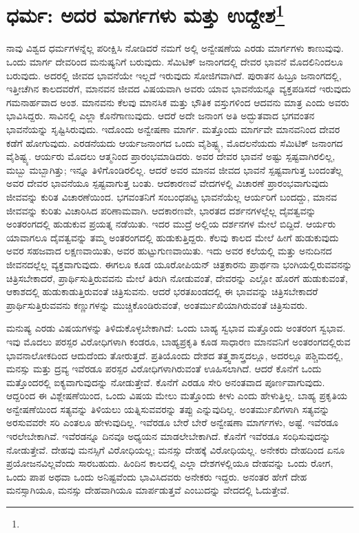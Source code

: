
\chapter[ಧರ್ಮ: ಅದರ ಮಾರ್ಗಗಳು ಮತ್ತು ಉದ್ದೇಶ]{ಧರ್ಮ: ಅದರ ಮಾರ್ಗಗಳು ಮತ್ತು ಉದ್ದೇಶ\protect\footnote{}}

ನಾವು ವಿಶ್ವದ ಧರ್ಮಗಳನ್ನೆಲ್ಲ ಪರೀಕ್ಷಿಸಿ ನೋಡಿದರೆ ನಮಗೆ ಅಲ್ಲಿ ಅನ್ವೇಷಣೆಯ ಎರಡು ಮಾರ್ಗಗಳು ಕಾಣುವುವು. ಒಂದು ಮಾರ್ಗ ದೇವರಿಂದ ಮನುಷ್ಯನಿಗೆ ಬರುವುದು. ಸೆಮಿಟಿಕ್ ಜನಾಂಗದಲ್ಲಿ ದೇವರ ಭಾವನೆ ಮೊದಲಿನಿಂದಲೂ ಬರುವುದು. ಅದರಲ್ಲಿ ಜೀವದ ಭಾವನೆಯೇ ಇಲ್ಲದೆ ಇರುವುದು ಸೋಜಿಗವಾಗಿದೆ. ಪುರಾತನ ಹಿಬ್ರೂ ಜನಾಂಗದಲ್ಲಿ, ಇತ್ತೀಚೆಗಿನ ಕಾಲದವರೆಗೆ, ಮಾನವನ ಜೀವದ ವಿಷಯವಾಗಿ ಅವರು ಯಾವ ಭಾವನೆಯನ್ನೂ ವ್ಯಕ್ತಪಡಿಸದೆ ಇರುವುದು ಗಮನಾರ್ಹವಾದ ಅಂಶ. ಮಾನವನು ಕೆಲವು ಮಾನಸಿಕ ಮತ್ತು ಭೌತಿಕ ವಸ್ತುಗಳಿಂದ ಆದವನು ಮಾತ್ರ ಎಂದು ಅವರು ಭಾವಿಸಿದ್ದರು. ಸಾವಿನಲ್ಲಿ ಎಲ್ಲಾ ಕೊನೆಗಾಣುವುದು. ಆದರೆ ಅದೇ ಜನಾಂಗ ಅತಿ ಅದ್ಭುತವಾದ ಭಗವಂತನ ಭಾವನೆಯನ್ನು ಸೃಷ್ಟಿಸಿರುವುದು. ಇದೊಂದು ಅನ್ವೇಷಣಾ ಮಾರ್ಗ. ಮತ್ತೊಂದು ಮಾರ್ಗವೇ ಮಾನವನಿಂದ ದೇವರ ಕಡೆಗೆ ಹೋಗುವುದು. ಎರಡನೆಯದು ಆರ್ಯಜನಾಂಗದ ಒಂದು ವೈಶಿಷ್ಟ್ಯ, ಮೊದಲನೆಯದು ಸೆಮಿಟಿಕ್ ಜನಾಂಗದ ವೈಶಿಷ್ಟ್ಯ. ಆರ್ಯರು ಮೊದಲು ಆತ್ಮನಿಂದ ಪ್ರಾರಂಭಮಾಡಿದರು. ಅವರ ದೇವರ ಭಾವನೆ ಅಷ್ಟು ಸ್ಪಷ್ಟವಾಗಿರಲಿಲ್ಲ, ಮಬ್ಬು ಮಬ್ಬಾಗಿತ್ತು; ಇನ್ನೂ ತಿಳಿಗೊಂಡಿರಲಿಲ್ಲ. ಆದರೆ ಅವರ ಮಾನವ ಜೀವದ ಭಾವನೆ ಸ್ಪಷ್ಟವಾಗುತ್ತ ಬಂದಂತೆಲ್ಲ ಅವರ ದೇವರ ಭಾವನೆಯೂ ಸ್ಪಷ್ಟವಾಗುತ್ತ ಬಂತು. ಆದಕಾರಣವೆ ವೇದಗಳಲ್ಲಿ ವಿಚಾರಣೆ ಪ್ರಾರಂಭವಾಗುವುದು ಜೀವವನ್ನು ಕುರಿತ ವಿಚಾರಣೆಯಿಂದ. ಭಗವಂತನಿಗೆ ಸಂಬಂಧಪಟ್ಟ ಭಾವನೆಯೆಲ್ಲ ಆರ್ಯರಿಗೆ ಬಂದದ್ದು, ಮಾನವ ಜೀವವನ್ನು ಕುರಿತು ವಿಚಾರಿಸಿದ ಪರಿಣಾಮವಾಗಿ. ಆದಕಾರಣವೇ, ಭಾರತದ ದರ್ಶನಗಳಲ್ಲೆಲ್ಲ ದೈವತ್ವವನ್ನು ಅಂತರಂಗದಲ್ಲಿ ಹುಡುಕುವ ಪ್ರಯತ್ನ ನಡೆಯಿತು. ಇದರ ಮುದ್ರೆ ಅಲ್ಲಿಯ ದರ್ಶನಗಳ ಮೇಲೆ ಬಿದ್ದಿದೆ. ಆರ್ಯರು ಯಾವಾಗಲೂ ದೈವತ್ವವನ್ನು ತಮ್ಮ ಅಂತರಂಗದಲ್ಲಿ ಹುಡುಕುತ್ತಿದ್ದರು. ಕೆಲವು ಕಾಲದ ಮೇಲೆ ಹೀಗೆ ಹುಡುಕುವುದು ಅವರ ಸಹಜವಾದ ಲಕ್ಷಣವಾಯಿತು, ಅವರ ಹುಟ್ಟುಗುಣವಾಯಿತು. ಇದು ಅವರ ಕಲೆಯಲ್ಲಿ ಮತ್ತು ಅನುದಿನದ ಜೀವನದಲ್ಲೆಲ್ಲ ವ್ಯಕ್ತವಾಗುವುದು. ಈಗಲೂ ಕೂಡ ಯೂರೋಪಿಯನ್ ಚಿತ್ರಕಾರನು ಪ್ರಾರ್ಥನಾ ಭಂಗಿಯಲ್ಲಿರುವವನನ್ನು ಚಿತ್ರಿಸಬೇಕಾದರೆ, ಪ್ರಾರ್ಥಿಸುತ್ತಿರುವವನು ಮೇಲೆ ತಿರುಗಿ ನೋಡುವಂತೆ, ದೇವರನ್ನು ಎಲ್ಲೋ ಹೊರಗೆ ಹುಡುಕುವಂತೆ, ಆಕಾಶದಲ್ಲಿ ಹುಡುಕಾಡುತ್ತಿರುವಂತೆ ಚಿತ್ರಿಸುವನು. ಆದರೆ ಭರತಖಂಡದಲ್ಲಿ ಈ ಭಾವವನ್ನು ಚಿತ್ರಿಸಬೇಕಾದರೆ ಪ್ರಾರ್ಥಿಸುತ್ತಿರುವವನು ಕಣ್ಣುಗಳನ್ನು ಮುಚ್ಚಿಕೊಂಡಿರುವಂತೆ, ಅಂತರ್ಮುಖಿಯಾಗಿರುವಂತೆ ಚಿತ್ರಿಸುವರು.

ಮನುಷ್ಯ ಎರಡು ವಿಷಯಗಳನ್ನು ತಿಳಿದುಕೊಳ್ಳಬೇಕಾಗಿದೆ: ಒಂದು ಬಾಹ್ಯ ಸ್ವಭಾವ ಮತ್ತೊಂದು ಅಂತರಂಗ ಸ್ವಭಾವ. ಇವು ಮೊದಲು ಪರಸ್ಪರ ವಿರೋಧಿಗಳಾಗಿ ಕಂಡರೂ, ಬಾಹ್ಯಪ್ರಕೃತಿ ಕೂಡ ಸಾಧಾರಣ ಮಾನವನಿಗೆ ಅಂತರಂಗದಲ್ಲಿರುವ ಭಾವನಾಲೋಕದಿಂದ ಆದುದೆಂದು ತೋರುತ್ತದೆ. ಪ್ರತಿಯೊಂದು ದೇಶದ ತತ್ತ್ವಶಾಸ್ತ್ರದಲ್ಲೂ, ಅದರಲ್ಲೂ ಪಶ್ಚಿಮದಲ್ಲಿ, ಮನಸ್ಸು ಮತ್ತು ದ್ರವ್ಯ ಇವೆರಡೂ ಪರಸ್ಪರ ವಿರೋಧಿಗಳಾಗಿರುವಂತೆ ಊಹಿಸಲಾಗಿದೆ. ಆದರೆ ಕೊನೆಗೆ ಒಂದು ಮತ್ತೊಂದರಲ್ಲಿ ಐಕ್ಯವಾಗುವುದನ್ನು ನೋಡುತ್ತೇವೆ. ಕೊನೆಗೆ ಎರಡೂ ಸೇರಿ ಅನಂತವಾದ ಪೂರ್ಣವಾಗುವುದು. ಆದ್ದರಿಂದ ಈ ವಿಶ್ಲೇಷಣೆಯಿಂದ, ಒಂದು ವಿಷಯ ಮೇಲು ಮತ್ತೊಂದು ಕೀಳು ಎಂದು ಹೇಳುತ್ತಿಲ್ಲ. ಬಾಹ್ಯ ಪ್ರಕೃತಿಯ ಅನ್ವೇಷಣೆಯಿಂದ ಸತ್ಯವನ್ನು ತಿಳಿಯಲು ಯತ್ನಿಸುವವರನ್ನು ತಪ್ಪು ಎನ್ನುವುದಿಲ್ಲ. ಅಂತರ್ಮುಖಿಗಳಾಗಿ ಸತ್ಯವನ್ನು ಅರಸುವವರೇ ಸರಿ ಎಂತಲೂ ಹೇಳುವುದಿಲ್ಲ. ಇವೆರಡೂ ಬೇರೆ ಬೇರೆ ಅನ್ವೇಷಣಾ ಮಾರ್ಗಗಳು, ಅಷ್ಟೆ. ಇವೆರಡೂ ಇರಲೇಬೇಕಾಗಿವೆ. ಇವೆರಡನ್ನೂ ದಿನವೂ ಅಧ್ಯಯನ ಮಾಡಲೇಬೇಕಾಗಿದೆ. ಕೊನೆಗೆ ಇವೆರಡೂ ಸಂಧಿಸುವುದನ್ನು ನೋಡುತ್ತೇವೆ. ದೇಹವು ಮನಸ್ಸಿಗೆ ವಿರೋಧಿಯಲ್ಲ; ಮನಸ್ಸು ದೇಹಕ್ಕೆ ವಿರೋಧಿಯಲ್ಲ. ಅನೇಕರು ದೇಹದಿಂದ ಏನೂ ಪ್ರಯೋಜನವಿಲ್ಲವೆಂದು ಸಾರಬಹುದು. ಹಿಂದಿನ ಕಾಲದಲ್ಲಿ ಎಲ್ಲಾ ದೇಶಗಳಲ್ಲಿಯೂ ದೇಹವನ್ನು ಒಂದು ರೋಗ, ಒಂದು ಪಾಪ ಅಥವಾ ಒಂದು ಅನಿಷ್ಟವೆಂದು ಭಾವಿಸಿದವರು ಅನೇಕರು ಇದ್ದರು. ಅನಂತರ ಹೇಗೆ ದೇಹ ಮನಸ್ಸಾಗಿಯೂ, ಮನಸ್ಸು ದೇಹವಾಗಿಯೂ ಮಾರ್ಪಡುತ್ತವೆ ಎಂಬುದನ್ನು ವೇದದಲ್ಲಿ ಓದುತ್ತೇವೆ.

